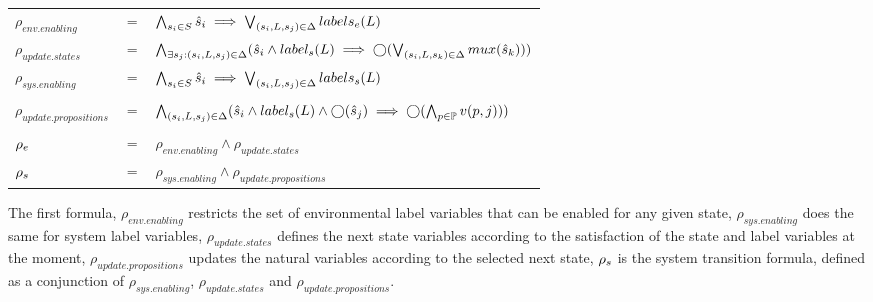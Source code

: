 \vspace{1em}
\begin{tabular}{ l c l }
	$\rho_{env.enabling}$ &$=$& $\bigwedge_{s_i \in S} \hat{s}_{i} \implies \bigvee_{(s_i,L,s_j) \in \Delta}labels_e(L)$\\
	$\rho_{update.states}$&$=$&$\bigwedge_{\exists s_j:(s_i,L,s_j) \in \Delta} (\hat{s}_{i} \wedge label_s(L) \implies \bigcirc(\bigvee_{(s_i,L,s_k) \in \Delta}mux(\hat{s}_{k})) ) $\\	
	$\rho_{sys.enabling}$ &$=$& $\bigwedge_{s_i \in S} \hat{s}_{i} \implies \bigvee_{(s_i,L,s_j) \in \Delta}labels_s(L)$\\
	&&\\
	$\rho_{update.propositions}$&$=$&$\bigwedge_{(s_i,L,s_j) \in \Delta} (\hat{s}_{i} \wedge label_s(L) \wedge \bigcirc(\hat{s}_{j}) \implies \bigcirc(\bigwedge_{p \in \mathbb{P}}v(p,j) ) )$\\
	&&\\
	${\rho_e}$&$=$&$\rho_{env.enabling} \wedge  \rho_{update.states}$\\		
	${\rho_s}$&$=$&$\rho_{sys.enabling} \wedge  \rho_{update.propositions}$\\	
\end{tabular}
\vspace{1em}

The first formula, $\rho_{env.enabling}$ restricts the set of environmental label variables that can be enabled for any given state, $\rho_{sys.enabling}$ does the same for system label variables, $\rho_{update.states}$ defines the next state variables according to the satisfaction of the state and label variables at the moment, $\rho_{update.propositions}$ updates the natural variables according to the selected next state, ${\rho_s}$ is the system transition formula, defined as a conjunction of $\rho_{sys.enabling}$, $\rho_{update.states}$ and $\rho_{update.propositions}$.
%
%

